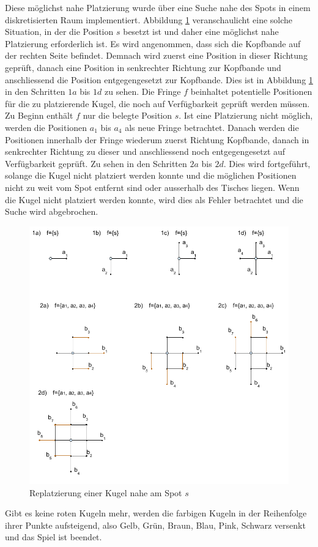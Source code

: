 Diese möglichst nahe Platzierung wurde über eine Suche nahe des Spots in einem diskretisierten Raum implementiert.
Abbildung \ref{fig:snooker_spot_replacement} veranschaulicht eine solche Situation, in der die Position $s$ besetzt
ist und daher eine möglichst nahe Platzierung erforderlich ist.
Es wird angenommen, dass sich die Kopfbande auf der rechten Seite befindet. Demnach wird zuerst eine Position in dieser
Richtung geprüft, danach eine Position in senkrechter Richtung zur Kopfbande und anschliessend die Position entgegengesetzt
zur Kopfbande.
Dies ist in Abbildung \ref{fig:snooker_spot_replacement} in den Schritten $1a$ bis $1d$ zu sehen.
Die Fringe $f$ beinhaltet potentielle Positionen für die zu platzierende Kugel, die noch auf Verfügbarkeit geprüft werden müssen.
Zu Beginn enthält $f$ nur die belegte Position $s$.
Ist eine Platzierung nicht möglich, werden die Positionen $a_1$ bis $a_4$ als neue Fringe betrachtet. Danach werden die Positionen
innerhalb der Fringe wiederum zuerst Richtung Kopfbande, danach in senkrechter Richtung zu dieser und anschliessend noch entgegengesetzt
auf Verfügbarkeit geprüft. Zu sehen in den Schritten $2a$ bis $2d$. Dies wird fortgeführt, solange die Kugel nicht platziert
werden konnte und die möglichen Positionen nicht zu weit vom Spot entfernt sind oder ausserhalb des Tisches liegen.
Wenn die Kugel nicht platziert werden konnte, wird dies als Fehler betrachtet und die Suche wird abgebrochen.

\begin{figure}[h!]
    \begin{center}
        \includegraphics[width=0.6\linewidth]{../common/03_billiard_ai/resources/40_replatzierung_kugel.png}
    \end{center}
    \caption{Replatzierung einer Kugel nahe am Spot $s$}
    \label{fig:snooker_spot_replacement}
\end{figure}

Gibt es keine roten Kugeln mehr, werden die farbigen Kugeln in der Reihenfolge ihrer Punkte aufsteigend,
also Gelb, Grün, Braun, Blau, Pink, Schwarz versenkt und das Spiel ist beendet\cite{stoppball:spielregel:snooker}.
